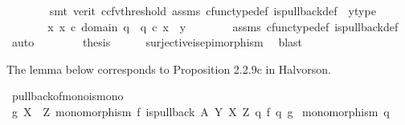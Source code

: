 \begin{isabellebody}
\ \ \ \ \ \ \isamarkupfalse%
\ {\isacharparenleft}{\kern0pt}smt\ {\isacharparenleft}{\kern0pt}verit{\isacharcomma}{\kern0pt}\ ccfv{\isacharunderscore}{\kern0pt}threshold{\isacharparenright}{\kern0pt}\ assms{\isacharparenleft}{\kern0pt}{}{\isacharparenright}{\kern0pt}\ cfunc{\isacharunderscore}{\kern0pt}type{\isacharunderscore}{\kern0pt}def\ is{\isacharunderscore}{\kern0pt}pullback{\isacharunderscore}{\kern0pt}def\ \ y{\isacharunderscore}{\kern0pt}type{\isacharparenright}{\kern0pt}\ \ \ \ \ \ \isanewline
\ \ \ \ \isamarkupfalse%
\ \isamarkupfalse%
\ {\isachardoublequoteopen}{\isasymexists}x{\isachardot}{\kern0pt}\ x\ {\isasymin}\isactrlsub c\ domain\ q{}\ {\isasymand}\ q{}\ {\isasymcirc}\isactrlsub c\ x\ {\isacharequal}{\kern0pt}\ y{\isachardoublequoteclose}\isanewline
\ \ \ \ \ \ \isamarkupfalse%
\ assms{\isacharparenleft}{\kern0pt}{}{\isacharparenright}{\kern0pt}\ cfunc{\isacharunderscore}{\kern0pt}type{\isacharunderscore}{\kern0pt}def\ is{\isacharunderscore}{\kern0pt}pullback{\isacharunderscore}{\kern0pt}def\ \ \isamarkupfalse%
\ auto\isanewline
\ \ \isamarkupfalse%
\isanewline
\ \ \isamarkupfalse%
\ \isamarkupfalse%
\ {\isacharquery}{\kern0pt}thesis\isanewline
\ \ \ \ \isamarkupfalse%
\ surjective{\isacharunderscore}{\kern0pt}is{\isacharunderscore}{\kern0pt}epimorphism\ \isamarkupfalse%
\ blast\isanewline
{}\isamarkupfalse%
%
\endisatagproof
{\isafoldproof}%
%
\isadelimproof
%
\endisadelimproof
%
\begin{isamarkuptext}%
The lemma below corresponds to Proposition 2.2.9c in Halvorson.%
\end{isamarkuptext}\isamarkuptrue%
\isamarkupfalse%
\ pullback{\isacharunderscore}{\kern0pt}of{\isacharunderscore}{\kern0pt}mono{\isacharunderscore}{\kern0pt}is{\isacharunderscore}{\kern0pt}mono{}{\isacharcolon}{\kern0pt}\isanewline
{}\ {\isachardoublequoteopen}g{\isacharcolon}{\kern0pt}\ X\ {\isasymrightarrow}\ Z{\isachardoublequoteclose}\ {\isachardoublequoteopen}monomorphism\ f{\isachardoublequoteclose}\ {\isachardoublequoteopen}is{\isacharunderscore}{\kern0pt}pullback\ A\ Y\ X\ Z\ q{}\ f\ q{}\ g{\isachardoublequoteclose}\isanewline
{}\ {\isachardoublequoteopen}monomorphism\ q{}{\isachardoublequoteclose}\ \isanewline
%
\isadelimproof
%
\endisadelimproof
%
\isatagproof
{}\isamarkupfalse%

\end{isabellebody}

